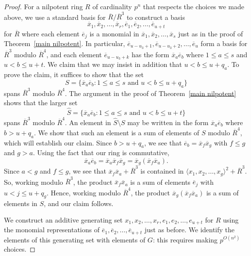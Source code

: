 \documentclass[12pt]{article}
\begin{document}
\begin{proof}
For a nilpotent ring $R$ of cardinality $p^n$ that respects the choices we made above, we use a standard basis for $\overline{R}/\overline{R}^3$ to construct a basis
\[
\overline{x}_1,\overline{x}_2, \ldots,\overline{x}_r,\overline{e}_1,\overline{e}_2,\ldots,\overline{e}_{u+t} 
\]
for $\overline{R}$ where each element $\overline{e}_j$ is a monomial in $\overline{x}_1,\overline{x}_2,\ldots,\overline{x}_s$ just as in the proof of Theorem~\ref{main nilpotent}.  
In particular, $\overline{e}_{u-u_3+1},\overline{e}_{u-u_3+2},\ldots,\overline{e}_{u}$ form a basis for $\overline{R}^3$ modulo $\overline{R}^4$, and each element
$\overline{e}_{u-u_3+k}$ has the form $\overline{x}_{a}\overline{e}_{b}$ where $1\leq a\leq s$ and $u< b\leq u+t$. We claim that we may insist in addition that
$u< b\leq u+q_a$. To prove the claim, it suffices to show that the set
\[
S=\{\overline{x}_{a}\overline{e}_{b}:1\leq a\leq s\text{ and }u< b\leq u+q_a\}
\]
spans $\overline{R}^3$ modulo $\overline{R}^4$. The argument in the proof of Theorem~\ref{main nilpotent} shows that the larger set
\[
\hat{S}=\{\overline{x}_{a}\overline{e}_{b}:1\leq a\leq s\text{ and }u< b\leq u+t\} 
\]
spans $\overline{R}^3$ modulo $\overline{R}^4$. An element in $\hat{S}\setminus S$ may be written in the form $\overline{x}_{a}\overline{e}_{b}$ where $b>u+q_{a}$. We show that such an element is a sum of elements of $S$ modulo $\overline{R}^4$, which will establish our claim. Since $b>u+q_{a}$, we see that $\overline{e}_b=\overline{x}_{f}\overline{x}_{g}$ with $f\leq g$ and $g>a$. Using the fact that our ring is commutative,
\[
\overline{x}_{a}\overline{e}_{b}=\overline{x}_{a}\overline{x}_{f}\overline{x}_{g}=\overline{x}_{g}(\overline{x}_{f}\overline{x}_{a}).
\]
Since $a<g$ and $f\leq g$, we see that $\overline{x}_{f}\overline{x}_{a}+\overline{R}^3$ is contained in $\langle{x_1},x_2,\ldots,x_{g}\rangle^2+\overline{R}^3$. So,
working modulo $\overline{R}^3$, the product $\overline{x}_{f}\overline{x}_{a}$ is a sum of elements $\overline{e}_j$ with $u< j\leq u+q_{g}$. Hence, working modulo $\overline{R}^4$, the product $\overline{x}_{g}(\overline{x}_{f}\overline{x}_{a})$ is a sum of elements in $S$, and our claim follows.

We construct an additive generating set $x_1,x_2,\ldots,x_r,e_1,e_2,\ldots ,e_{u+t}$ for $R$ using the monomial representations of $\overline{e}_1,\overline{e}_2,\ldots ,\overline{e}_{u+t}$ just as before. We identify the elements of this generating set with elements of $G$: this requires making $p^{O(n^2)}$ choices.


\end{proof}
\end{document}
